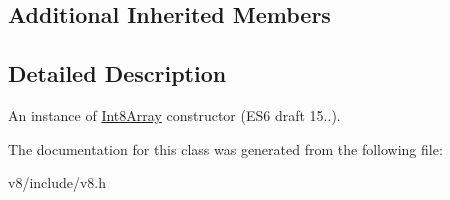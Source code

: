 \subsection*{Additional Inherited Members}


\subsection{Detailed Description}
An instance of \mbox{\hyperlink{classv8_1_1Int8Array}{Int8\+Array}} constructor (E\+S6 draft 15..). 

The documentation for this class was generated from the following file\+:\begin{DoxyCompactItemize}
\item 
v8/include/v8.\+h\end{DoxyCompactItemize}
